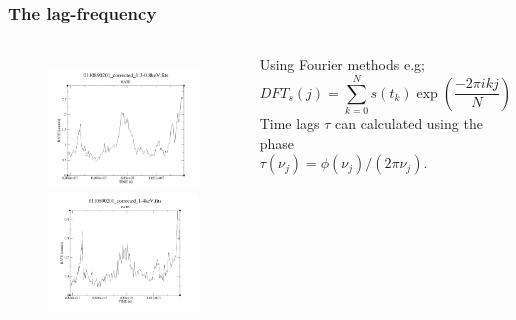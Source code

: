 \documentclass[]{beamer}
\begin{document}
\begin{frame}
\frametitle{The lag-frequency}
\begin{columns}
\begin{figure}
\includegraphics[scale=.182]{1H0707-495_0110890201_soft_lc} \\
\includegraphics[scale=.174]{1H0707-495_0110890201_1-4keV_lc}
\end{figure}
Using Fourier methods e.g; 
\begin{equation}
DFT_s(j)=\sum_{k=0}^{N}s(t_k) \exp\left(\frac{-2\pi ikj}{N}\right)\nonumber
\end{equation}
Time lags $\tau$ can calculated using the phase \\\vspace{0.2cm} $\tau(\nu_j)=\phi(\nu_j)/(2\pi\nu_j)$.
\end{columns}
\end{frame}
\end{document}

